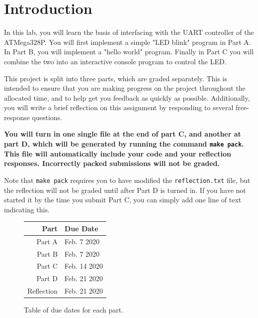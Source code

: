 \documentclass{article}
\begin{document}
\section{Introduction}

In this lab, you will learn the basis of interfacing with the UART controller
of the ATMega328P. You will first implement a simple "LED blink" program in
Part A. In Part B, you will implement a "hello world" program. Finally in Part
C you will combine the two into an interactive console program to control the
LED.

This project is split into three parts, which are graded separately. This is
intended to ensure that you are making progress on the project throughout the
allocated time, and to help get you feedback as quickly as possible.
Additionally, you will write a brief reflection on this assignment by
responding to several free-response questions.

\textbf{You will turn in one single file at the end of part C, and another at
part D, which will be generated by running the command \texttt{make pack}. This
file will automatically include your code and your reflection responses.
Incorrectly packed submissions will not be graded.}

Note that \texttt{make pack} requires you to have modified the
\texttt{reflection.txt} file, but the reflection will not be graded until after
Part D is turned in. If you have not started it by the time you submit Part C,
you can simply add one line of text indicating this.

\begin{figure}[H]

	\centering

	\begin{tabular}{r|l}

		Part & Due Date \\ \hline\hline
		Part A & Feb. 7 2020 \\ \hline
		Part B & Feb. 7 2020 \\ \hline
		Part C & Feb. 14 2020 \\ \hline
		Part D & Feb. 21 2020 \\ \hline
		Reflection & Feb. 21 2020 \\ \hline

	\end{tabular}

	\caption{Table of due dates for each part.}

\end{figure}
\end{document}

